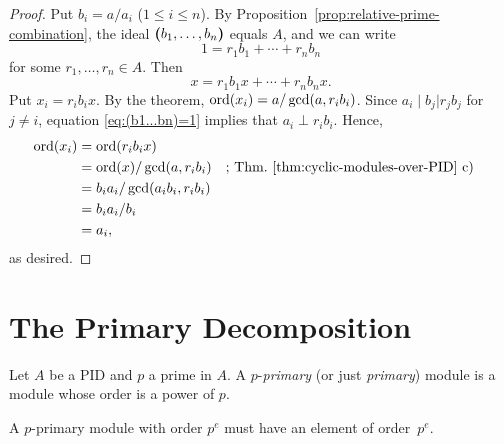 \begin{proof}
    Put $b_i=a/a_i$ ($1\le i\le n$). By Proposition~\ref{prop:relative-prime-combination}, the ideal $\textrm{\boldmath$($}b_1,\dots,b_n\textrm{\boldmath$)$}$ equals $A$, and we can write
    \begin{equation}\label{eq:(b1...bn)=1}
        1 = r_1b_1+\cdots+r_nb_n
    \end{equation}
    for some $r_1,\dots,r_n\in A$. Then
    $$
        x = r_1b_1x+\cdots+r_nb_nx.
    $$
    Put $x_i=r_ib_ix$. By the theorem, $\operatorname{ord}(x_i)=a/\gcd(a,r_ib_i)$. Since $a_i\mid b_j|r_jb_j$ for $j\ne i$, equation \eqref{eq:(b1...bn)=1} implies that $a_i\perp r_ib_i$. Hence,
    \begin{align*}
        \operatorname{ord}(x_i) &= \operatorname{ord}(r_ib_ix)\\
            &=\operatorname{ord}(x)/\gcd(a,r_ib_i)
                &&\text{; Thm.~\ref{thm:cyclic-modules-over-PID}~c)}\\
            &= b_ia_i/\gcd(a_ib_i,r_ib_i)\\
            &= b_ia_i/b_i\\
            &= a_i,
    \end{align*}
    as desired.
\end{proof}

\section{The Primary Decomposition}

\begin{defn}
    Let $A$ be a PID and\/ $p$ a prime in\/ $A$. A\/ $p$-\textsl{primary} (or just \textsl{primary}) module is a module whose order is a power of\/ $p$. 
\end{defn}

\begin{rem}\label{rem:primary-element-in-primary-module}
    A\/ $p$-primary module with order\/ $p^e$ must have an element of order\/~$p^e$.
\end{rem}

